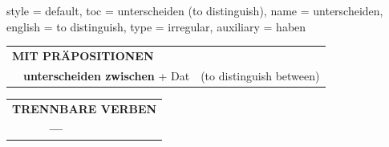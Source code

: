 \begin{verbentry}{
  style = {default},
  toc = {unterscheiden (to distinguish)},
  name = {unterscheiden},
  english = {to distinguish},
  type = {irregular},
  auxiliary = {haben}
}
\vspace{10pt}

\begin{tabular}{lll}
\multicolumn{3}{l}{\textbf{MIT PRÄPOSITIONEN}}\\
& \textbf{unterscheiden zwischen} + Dat & (to distinguish between)\\
\end{tabular}
\hfill
\begin{tabular}{lll}
\multicolumn{3}{l}{\textbf{TRENNBARE VERBEN}}\\
& \textbf{---} & \\
\end{tabular}

\vspace{-5pt}
\end{verbentry}

